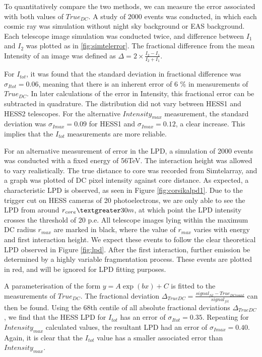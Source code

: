 \documentclass{article}
\begin{document}
To quantitatively compare the two methods, we can measure the error associated with both values of $True_{DC}$. A study of 2000 events was conducted, in which each cosmic ray was simulation without night sky background or EAS background. Each telescope image simulation was conducted twice, and difference between $I_{1}$ and $I_{2}$ was plotted as in \ref{fig:simtelerror}. The fractional difference from the mean Intensity of an image was defined as $\Delta = 2 \times \frac{I_{2} - I_{1}}{{I_{2} + I_{1}}}$. 

For $I_{tot}$, it was found that the standard deviation in fractional difference was $\sigma_{Itot}=0.06$, meaning that there is an inherent error of 6 \% in measurements of $True_{DC}$. In later calculations of the error in Intensity, this fractional error can be subtracted in quadrature. The distribution did not vary between HESS1 and HESS2 telescopes. For the alternative $Intensity_{max}$ measurement, the standard deviation was $\sigma_{Imax}=0.09$ for HESS1 and $\sigma_{Imax}=0.12$, a clear increase. This implies that the $I_{tot}$ measurements are more reliable.

For an alternative measurement of error in the LPD, a simulation of 2000 events was conducted with a fixed energy of 56TeV. The interaction height was allowed to vary realistically. The true distance to core was recorded from Sim\textunderscore telarray, and a graph was plotted of DC pixel intensity against core distance. As expected, a characteristic LPD is observed, as seen in Figure \ref{fig:corsikalpd1}. Due to the trigger cut on HESS cameras of 20 photoelectrons, we are only able to see the LPD from around $r_{core} \textgreater 30m$, at which point the LPD intensity crosses the threshold of 20 p.e. All telescope images lying within the maximum DC radius $r_{max}$ are marked in black, where the value of $r_{max}$ varies with energy and first interaction height. We expect these events to follow the clear theoretical LPD observed in Figure \ref{fig:lpd}. After the first interaction, further emission be determined by a highly variable fragmentation process. These events are plotted in red, and will be ignored for LPD fitting purposes. 

A parameterisation of the form $y = A \exp (b x) + C $ is fitted to the measurements of $True_{DC}$. The fractional deviation $\Delta_{TrueDC} = \frac{signal_{fit} - True_{DC count}}{signal_{fit}}$ can then be found. Using the 68th centile of all absolute fractional deviations $\Delta_{TrueDC}$, we find that the HESS LPD for $I_{tot}$ has an error of $\sigma_{Itot}=0.35$. Repeating for $Intensity_{max}$ calculated values, the resultant LPD had an error of $\sigma_{Imax} = 0.40$. Again, it is clear that the $I_{tot}$ value has a smaller associated error than $Intensity_{max}$.
\end{document}
